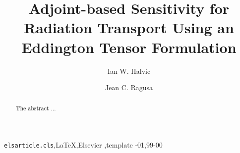 \documentclass[review]{elsarticle}
\begin{document}

\begin{frontmatter}

\title{Adjoint-based Sensitivity for Radiation Transport Using an Eddington Tensor Formulation}


\author{Ian W. Halvic}
\author{Jean C. Ragusa}

\address{Department of Nuclear Engineering, Texas A\&M University, College Station, TX, USA}

\begin{abstract}
The abstract ... 
\end{abstract}

\begin{keyword}
\texttt{elsarticle.cls}\sep \LaTeX\sep Elsevier \sep template
-01\sep  99-00
\end{keyword}

\end{frontmatter}



\end{document}

